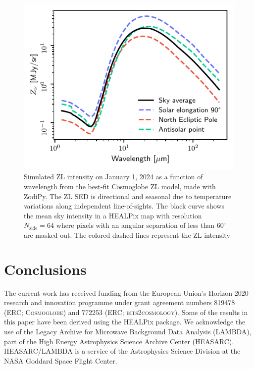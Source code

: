 \documentclass[twocolumn]{aa}
\begin{document}
\begin{figure}
    \centering
    \includegraphics[width=\columnwidth]{figs/zodi_intensity.pdf}
    \caption{Simulated ZL intensity on January 1, 2024 as a function of wavelength from the best-fit 
    Cosmoglobe ZL model, made with ZodiPy. The ZL SED is directional 
    and seasonal due to temperature variations along independent line-of-sights. 
    The black curve shows the mean sky intensity in a HEALPix map with resolution
    $N_\mathrm{side}= 64$ where pixels with an angular separation of less than
    $60^\circ$ are masked out. The colored dashed lines represent the ZL 
    intensity
    }
    \label{fig:zodi-intensity}
\end{figure}



\section{Conclusions}


\begin{acknowledgements}
 The current work has received funding from the European
  Union’s Horizon 2020 research and innovation programme under grant
  agreement numbers 819478 (ERC; \textsc{Cosmoglobe}) and 772253 (ERC;
  \textsc{bits2cosmology}). Some of the results in this paper have been 
  derived using the HEALPix \citep{Gorski2005} package.
  We acknowledge the use of the Legacy Archive for Microwave Background 
  Data
  Analysis (LAMBDA), part of the High Energy Astrophysics Science
  Archive Center
  (HEASARC). HEASARC/LAMBDA is a service of the Astrophysics Science 
  Division at the NASA Goddard Space Flight Center.  
\end{acknowledgements}
\end{document}
